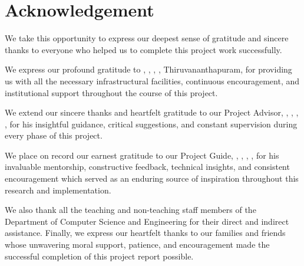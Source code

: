 \chapter*{Acknowledgement}%
%

\par We take this opportunity to express our deepest sense of gratitude and sincere thanks to everyone who helped us to complete this project work successfully. 

We express our profound gratitude to \textbf{\hod}, \hoddes, \dept, \college, Thiruvananthapuram, for providing us with all the necessary infrastructural facilities, continuous encouragement, and institutional support throughout the course of this project.

We extend our sincere thanks and heartfelt gratitude to our Project Advisor, \textbf{\projadvisor}, \projadvisordes, \dept, \college, for his insightful guidance, critical suggestions, and constant supervision during every phase of this project.

We place on record our earnest gratitude to our Project Guide, \textbf{\guide}, \guidedes, \dept, \college, for his invaluable mentorship, constructive feedback, technical insights, and consistent encouragement which served as an enduring source of inspiration throughout this research and implementation.

We also thank all the teaching and non-teaching staff members of the Department of Computer Science and Engineering for their direct and indirect assistance. Finally, we express our heartfelt thanks to our families and friends whose unwavering moral support, patience, and encouragement made the successful completion of this project report possible.

\vspace*{40pt}
\begin{flushright}
	\textbf{\studentA}\\
	\textbf{\studentB}\\
	\textbf{\studentC}\\
\end{flushright}
\thispagestyle{plain}
